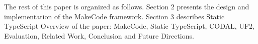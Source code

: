 
The rest of this paper is organized as follows. Section 2 presents the design and implementation of the MakeCode framework. Section 3 describes Static TypeScript Overview of the paper: MakeCode, Static TypeScript, CODAL, UF2, Evaluation, Related Work, Conclusion and Future Directions. 
